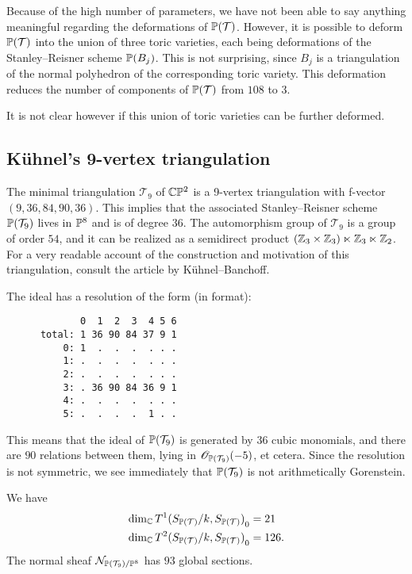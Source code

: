 Because of the high number of parameters, we have not been able to say anything meaningful regarding the deformations of $\P(\mathcal T)$. However, it is possible to deform $\P(\mathcal T)$ into the union of three toric varieties, each being deformations of the Stanley--Reisner scheme $\P(B_j)$. This is not surprising, since $B_j$ is a triangulation of the normal polyhedron of the corresponding toric variety. This deformation reduces the number of components of $\P(\mathcal T)$ from $108$ to $3$.

It is not clear however if this union of toric varieties can be further deformed.

\subsection{Kühnel's 9-vertex triangulation}

The minimal triangulation $\mathcal T_9$ of $\C \P^2$ is a 9-vertex triangulation with f-vector $(9,36,84,90,36)$. This implies that the associated Stanley--Reisner scheme $\P(\mathcal T_9)$ lives in $\P^8$ and is of degree $36$. The automorphism group of $\mathcal T_9$ is a group of order $54$, and it can be realized as a semidirect product $(\Z_3 \times \Z_3) \ltimes \Z_3 \ltimes \Z_2$. For a very readable account of the construction and motivation of this triangulation, consult the article \cite{kuhnel_9vertex} by Kühnel--Banchoff.

The ideal has a resolution of the form (in \MM format):

\begin{verbatim}
             0  1  2  3  4 5 6
      total: 1 36 90 84 37 9 1
          0: 1  .  .  .  . . .
          1: .  .  .  .  . . .
          2: .  .  .  .  . . .
          3: . 36 90 84 36 9 1
          4: .  .  .  .  . . .
          5: .  .  .  .  1 . .
\end{verbatim}

This means that the ideal of $\P(\mathcal T_9)$ is generated by $36$ cubic monomials, and there are $90$ relations between them, lying in $\OO_{\P(\mathcal T_9)}(-5)$, et cetera. Since the resolution is not symmetric, we see immediately that $\P(\mathcal T_9)$ is not arithmetically Gorenstein.

\begin{proposition}
We have
\begin{eqnarray*}
\dim_\C  {T^1(S_{\P(\mathcal T)}/k, S_{\P(\mathcal T)})}_0 &=  21 \\
\dim_\C  {T^2(S_{\P(\mathcal T)}/k, S_{\P(\mathcal T)})}_0 &= 126.
\end{eqnarray*}
The normal sheaf $\mathcal N_{\P(\mathcal T_9)/\P^{8}}$ has $93$ global sections.

\end{proposition}

